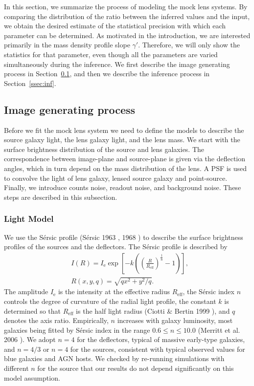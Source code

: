 \documentclass[a4paper,11pt]{article}
\begin{document}
In this section, we summarize the process of modeling the mock lens
systems. By comparing the distribution of the ratio between the
inferred values and the input, we obtain the desired estimate of the
statistical precision with which each parameter can be determined. As
motivated in the introduction, we are interested primarily in the mass
density profile slope $\gamma'$. Therefore, we will only show the
statistics for that parameter, even though all the parameters are
varied simultaneously during the inference. We first describe the
image generating process in Section~\ref{ssec:image}, and then we
describe the inference process in Section~\ref{ssec:inf}.

\subsection{Image generating process}
\label{ssec:image}

Before we fit the mock lens system we need to define the models to
describe the source galaxy light, the lens galaxy light, and the lens
mass. We start with the surface brightness distribution of the
source and lens galaxies. The correspondence between image-plane and source-plane
 is given via the deflection angles, which in turn depend on the mass distribution of the lens.
 A PSF is used to convolve the light of lens galaxy, lensed source galaxy and point-source.
 Finally, we introduce counts noise, readout noise, and background noise.
 These steps are described in this subsection.

\subsubsection{Light Model}

We use the S\'ersic profile (S{\'e}rsic 1963 \cite{1963BAAA....6...41S}, 1968 \cite{1968adga.book.....S})
to describe the surface brightness profiles of the sources and the deflectors. The
S\'ersic profile is described by %
%
\begin{eqnarray}
   \label{eq:Intensity}
   &I(R) = I_{\mathrm{e}} \exp\left[-k\left(\left(\frac{R}{R_{\mathrm{eff}}}\right)^{\frac{1}{\mathrm{n}}}-1\right)\right] ,\\
   &R(x,y,q) = \sqrt{qx^2+y^2/q}.
\end{eqnarray}
%
The amplitude $I_{\mathrm{e}}$ is the intensity at the effective
radius $R_{\mathrm{eff}}$, the S\'ersic index $n$ controls the degree
of curvature of the radial light profile, the constant $k$ is determined so that
$R_{\mathrm{eff}}$ is the half light radius (Ciotti \& Bertin 1999 \cite{1999A&A...352..447C}),
 and $q$ denotes the axis ratio. Empirically, $n$ increases with galaxy luminosity, most
galaxies being fitted by S\'ersic index in the range $0.6 \le n
\le 10.0$ (Merritt et al. 2006 \cite{2006AJ....132.2685M}). We adopt $n=4$ for the
deflectors, typical of massive early-type galaxies, and $n=4/3$ or
$n=4$ for the sources, consistent with typical observed values for
blue galaxies and AGN hosts. We checked by re-running simulations with
different $n$ for the source that our results do not depend
significantly on this model assumption.
\end{document}

